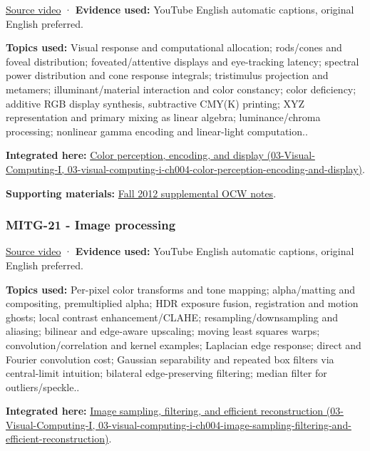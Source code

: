 \href{https://www.youtube.com/watch?v=aIVVBZ7cJBc}{Source video} · \textbf{Evidence used:} YouTube English automatic captions, original English preferred.

\textbf{Topics used:} Visual response and computational allocation; rods/cones and foveal distribution; foveated/attentive displays and eye-tracking latency; spectral power distribution and cone response integrals; tristimulus projection and metamers; illuminant/material interaction and color constancy; color deficiency; additive RGB display synthesis, subtractive CMY(K) printing; XYZ representation and primary mixing as linear algebra; luminance/chroma processing; nonlinear gamma encoding and linear-light computation..

\textbf{Integrated here:} \href{../03-Visual-Computing-I/main.pdf\#nameddest=03-visual-computing-i-ch004-color-perception-encoding-and-display}{Color perception, encoding, and display (03-Visual-Computing-I, 03-visual-computing-i-ch004-color-perception-encoding-and-display)}.

\textbf{Supporting materials:} \href{https://ocw.mit.edu/courses/6-837-computer-graphics-fall-2012/pages/lecture-notes/}{Fall 2012 supplemental OCW notes}.

\subsubsection{MITG-21 - Image processing}\label{04-visual-computing-ii-ch036-mitg-21---image-processing}

\href{https://www.youtube.com/watch?v=WWLxaVzkneI}{Source video} · \textbf{Evidence used:} YouTube English automatic captions, original English preferred.

\textbf{Topics used:} Per-pixel color transforms and tone mapping; alpha/matting and compositing, premultiplied alpha; HDR exposure fusion, registration and motion ghosts; local contrast enhancement/CLAHE; resampling/downsampling and aliasing; bilinear and edge-aware upscaling; moving least squares warps; convolution/correlation and kernel examples; Laplacian edge response; direct and Fourier convolution cost; Gaussian separability and repeated box filters via central-limit intuition; bilateral edge-preserving filtering; median filter for outliers/speckle..

\textbf{Integrated here:} \href{../03-Visual-Computing-I/main.pdf\#nameddest=03-visual-computing-i-ch004-image-sampling-filtering-and-efficient-reconstruction}{Image sampling, filtering, and efficient reconstruction (03-Visual-Computing-I, 03-visual-computing-i-ch004-image-sampling-filtering-and-efficient-reconstruction)}.

